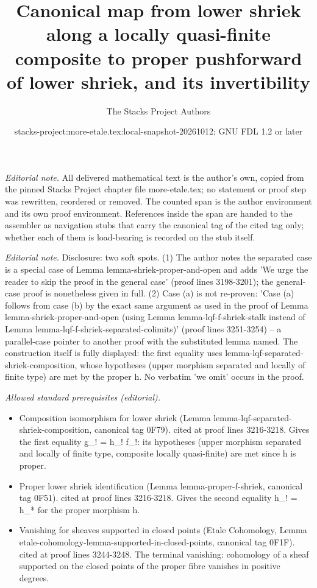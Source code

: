 \documentclass{stacks-project}
\title{Canonical map from lower shriek along a locally quasi-finite composite to proper pushforward of lower shriek, and its invertibility}
\author{The Stacks Project Authors}
\date{stacks-project:more-etale.tex:local-snapshot-20261012; GNU FDL 1.2 or later}
\theoremstyle{plain}
\theoremstyle{definition}
\theoremstyle{remark}
\numberwithin{equation}{subsection}
\begin{document}
\maketitle
\setcounter{subsection}{1}
\noindent\textit{Editorial note.} All delivered mathematical text is the author's own, copied from the pinned Stacks Project chapter file more-etale.tex; no statement or proof step was rewritten, reordered or removed. The counted span is the author environment and its own proof environment. References inside the span are handed to the assembler as navigation stubs that carry the canonical tag of the cited tag only; whether each of them is load-bearing is recorded on the stub itself.\par\medskip
\noindent\textit{Editorial note.} Disclosure: two soft spots. (1) The author notes the separated case is a special case of Lemma lemma-shriek-proper-and-open and adds 'We urge the reader to skip the proof in the general case' (proof lines 3198-3201); the general-case proof is nonetheless given in full. (2) Case (a) is not re-proven: 'Case (a) follows from case (b) by the exact same argument as used in the proof of Lemma lemma-shriek-proper-and-open (using Lemma lemma-lqf-f-shriek-stalk instead of Lemma lemma-lqf-f-shriek-separated-colimits)' (proof lines 3251-3254) -- a parallel-case pointer to another proof with the substituted lemma named. The construction itself is fully displayed: the first equality uses lemma-lqf-separated-shriek-composition, whose hypotheses (upper morphism separated and locally of finite type) are met by the proper h. No verbatim 'we omit' occurs in the proof.\par\medskip
\noindent\textit{Allowed standard prerequisites (editorial).}\begin{itemize}
\item Composition isomorphism for lower shriek (Lemma lemma-lqf-separated-shriek-composition, canonical tag 0F79). cited at proof lines 3216-3218. Gives the first equality g\_! = h\_! f\_!: its hypotheses (upper morphism separated and locally of finite type, composite locally quasi-finite) are met since h is proper.
\item Proper lower shriek identification (Lemma lemma-proper-f-shriek, canonical tag 0F51). cited at proof lines 3216-3218. Gives the second equality h\_! = h\_* for the proper morphism h.
\item Vanishing for sheaves supported in closed points (Etale Cohomology, Lemma etale-cohomology-lemma-supported-in-closed-points, canonical tag 0F1F). cited at proof lines 3244-3248. The terminal vanishing: cohomology of a sheaf supported on the closed points of the proper fibre vanishes in positive degrees.
\end{itemize}\medskip
\end{document}
